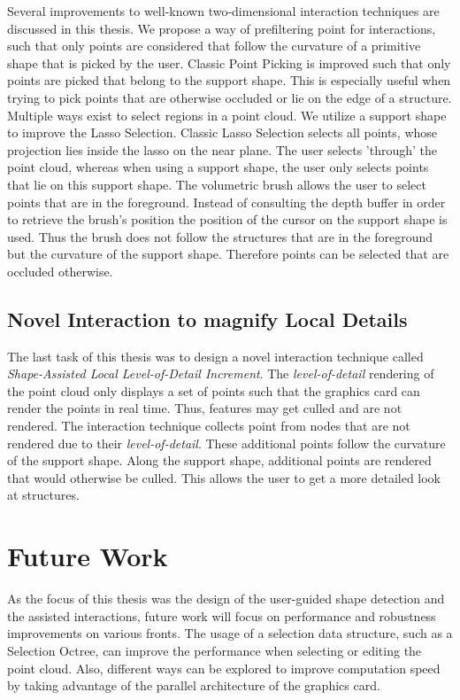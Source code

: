 Several improvements to well-known two-dimensional interaction techniques are discussed in this thesis. We propose a way of prefiltering point for interactions, such that only points are considered that follow the curvature of a primitive shape that is picked by the user. Classic Point Picking is improved such that only points are picked that belong to the support shape. This is especially useful when trying to pick points that are otherwise occluded or lie on the edge of a structure. Multiple ways exist to select regions in a point cloud. We utilize a support shape to improve the Lasso Selection. Classic Lasso Selection selects all points, whose projection lies inside the lasso on the near plane. The user selects 'through' the point cloud, whereas when using a support shape, the user only selects points that lie on this support shape. The volumetric brush allows the user to select points that are in the foreground. Instead of consulting the depth buffer in order to retrieve the brush's position the position of the cursor on the support shape is used. Thus the brush does not follow the structures that are in the foreground but the curvature of the support shape. Therefore points can be selected that are occluded otherwise. 


\subsection{Novel Interaction to magnify Local Details}

The last task of this thesis was to design a novel interaction technique called \textit{Shape-Assisted Local Level-of-Detail Increment}. The \textit{level-of-detail} rendering of the point cloud only displays a set of points such that the graphics card can render the points in real time. Thus, features may get culled and are not rendered. The interaction technique collects point from nodes that are not rendered due to their \textit{level-of-detail}. These additional points follow the curvature of the support shape. Along the support shape, additional points are rendered that would otherwise be culled. This allows the user to get a more detailed look at structures. 


\section{Future Work}

As the focus of this thesis was the design of the user-guided shape detection and the assisted interactions, future work will focus on performance and robustness improvements on various fronts. The usage of a selection data structure, such as a Selection Octree\cite{scheiblauer2011out}, can improve the performance when selecting or editing the point cloud. Also, different ways can be explored to improve computation speed by taking advantage of the parallel architecture of the graphics card. 
\\

